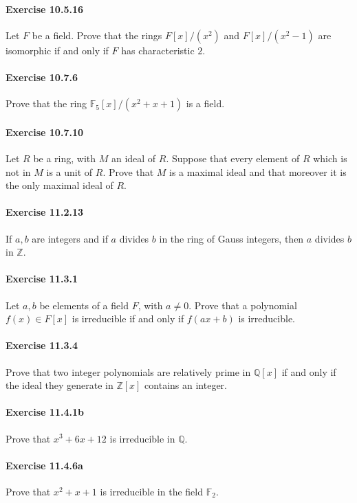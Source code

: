 \documentclass{article}
\begin{document}
\paragraph{Exercise 10.5.16} Let $F$ be a field. Prove that the rings $F[x] /\left(x^2\right)$ and $F[x] /\left(x^2-1\right)$ are isomorphic if and only if $F$ has characteristic $2 .$


\paragraph{Exercise 10.7.6} Prove that the ring $\mathbb{F}_5[x] /\left(x^2+x+1\right)$ is a field.


\paragraph{Exercise 10.7.10} Let $R$ be a ring, with $M$ an ideal of $R$. Suppose that every element of $R$ which is not in $M$ is a unit of $R$. Prove that $M$ is a maximal ideal and that moreover it is the only maximal ideal of $R$.


\paragraph{Exercise 11.2.13} If $a, b$ are integers and if $a$ divides $b$ in the ring of Gauss integers, then $a$ divides $b$ in $\mathbb{Z}$.


\paragraph{Exercise 11.3.1} Let $a, b$ be elements of a field $F$, with $a \neq 0$. Prove that a polynomial $f(x) \in F[x]$ is irreducible if and only if $f(a x+b)$ is irreducible.


\paragraph{Exercise 11.3.4} Prove that two integer polynomials are relatively prime in $\mathbb{Q}[x]$ if and only if the ideal they generate in $\mathbb{Z}[x]$ contains an integer.


\paragraph{Exercise 11.4.1b} Prove that $x^3 + 6x + 12$ is irreducible in $\mathbb{Q}$.


\paragraph{Exercise 11.4.6a} Prove that $x^2+x+1$ is irreducible in the field $\mathbb{F}_2$.
\end{document}
